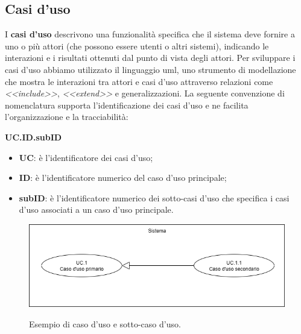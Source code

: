 \subsection{Casi d'uso}
\label{casi-uso}
I \textbf{casi d'uso} descrivono una funzionalità specifica che il sistema deve fornire a uno o più attori (che possono essere utenti o altri sistemi), indicando le interazioni e i risultati ottenuti dal punto di vista degli attori.
Per sviluppare i casi d'uso abbiamo utilizzato il linguaggio \gls{uml}, uno strumento di modellazione che mostra le interazioni tra attori e casi d'uso attraverso relazioni come \textit{<<include>>}, \textit{<<extend>>} e generalizzazioni.
La seguente convenzione di nomenclatura supporta l'identificazione dei casi d'uso e ne facilita l'organizzazione e la tracciabilità:\\
\begin{center}
\textbf{UC.ID.subID}
\end{center}
\begin{itemize}
    \item \textbf{UC}: è l'identificatore dei casi d'uso;
    \item \textbf{ID}: è l'identificatore numerico del caso d'uso principale;
    \item \textbf{subID}: è l'identificatore numerico dei sotto-casi d'uso che specifica i casi d'uso associati a un caso d'uso principale.
\end{itemize}
\begin{figure}[H]
    \begin{center}
        \includegraphics[alt={Esempio di caso d'uso e sotto-caso d'uso}, width=0.8\columnwidth]{img/esempio_uc.png}
        \caption{Esempio di caso d'uso e sotto-caso d'uso.}
        \label{fig:es-uc}
    \end{center}
\end{figure}
